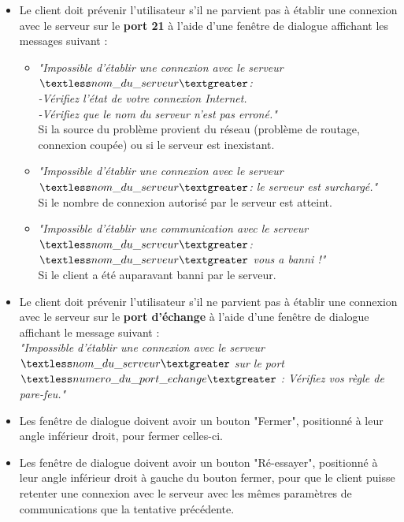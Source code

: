 \documentclass[10pt,a4paper]{report}
\begin{document}
		\begin{itemize}[label = $\triangleright$]
			\item Le client doit prévenir l'utilisateur s'il ne parvient pas à établir une connexion avec le serveur sur le \textbf{port 21} à l'aide d'une fenêtre de dialogue affichant les messages suivant : 

			\begin{itemize}
				\item \textit{"Impossible d'établir une connexion avec le serveur $\textless nom\_du\_serveur\textgreater$:\\
-Vérifiez l'état de votre connexion Internet.\\
-Vérifiez que le nom du serveur n'est pas erroné."\\}
Si la source du problème provient du réseau (problème de routage, connexion coupée) ou si le serveur est inexistant.

				\item \textit{"Impossible d'établir une connexion avec le serveur $\textless nom\_du\_serveur\textgreater$: le serveur est surchargé."\\}
Si le nombre de connexion autorisé par le serveur est atteint.

				\item \textit{"Impossible d'établir une communication avec le serveur $\textless nom\_du\_serveur\textgreater$:\\
$\textless nom\_du\_serveur\textgreater$ vous a banni !"\\}
Si le client a été auparavant banni par le serveur. 
			\end{itemize}

			\item Le client doit prévenir l'utilisateur s'il ne parvient pas à établir une connexion avec le serveur sur le \textbf{port d'échange} à l'aide d'une fenêtre de dialogue affichant le message suivant : \\
\textit{"Impossible d'établir une connexion avec le serveur $\textless nom\_du\_serveur\textgreater$ sur le port $\textless numero\_du\_port\_echange\textgreater$ : Vérifiez vos règle de pare-feu."\\}

			\item Les fenêtre de dialogue doivent avoir un bouton "Fermer", positionné à leur angle inférieur droit, pour fermer celles-ci.

			\item Les fenêtre de dialogue doivent avoir un bouton "Ré-essayer", positionné à leur angle inférieur droit à gauche du bouton fermer, pour que le client puisse retenter une connexion avec le serveur avec les mêmes paramètres de communications que la tentative précédente.

		\end{itemize}
		
\end{document}
